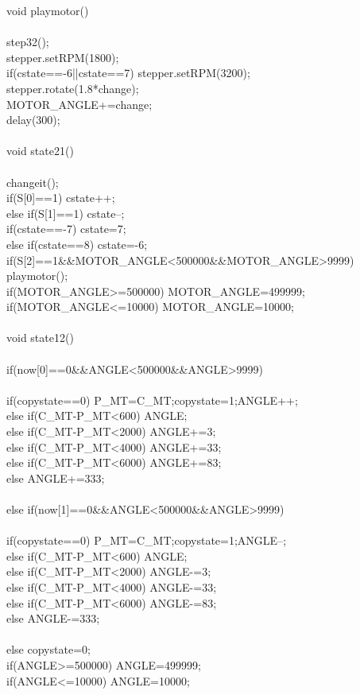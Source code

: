 void playmotor()\\
{\\
	step32();\\
	stepper.setRPM(1800);\\
	if(cstate==-6||cstate==7) stepper.setRPM(3200);\\
	stepper.rotate(1.8*change);\\
	MOTOR\_ANGLE+=change;\\
	delay(300);\\
}\\
void state21()\\
{\\
	changeit();\\
	if(S[0]==1) cstate++;\\
	else if(S[1]==1) cstate--;\\
	if(cstate==-7) cstate=7;\\
	else if(cstate==8) cstate=-6;\\
	if(S[2]==1\&\&MOTOR\_ANGLE<500000\&\&MOTOR\_ANGLE>9999) playmotor();\\
	if(MOTOR\_ANGLE>=500000) MOTOR\_ANGLE=499999;\\
	if(MOTOR\_ANGLE<=10000) MOTOR\_ANGLE=10000;\\
}\\
void state12()\\
{\\
	if(now[0]==0\&\&ANGLE<500000\&\&ANGLE>9999)\\
	{\\
		if(copystate==0) {P\_MT=C\_MT;copystate=1;ANGLE++;}\\
		else if(C\_MT-P\_MT<600) ANGLE;\\
		else if(C\_MT-P\_MT<2000) ANGLE+=3;\\
		else if(C\_MT-P\_MT<4000) ANGLE+=33;\\
		else if(C\_MT-P\_MT<6000) ANGLE+=83;\\
		else ANGLE+=333;\\
	}\\
	else if(now[1]==0\&\&ANGLE<500000\&\&ANGLE>9999)\\
	{\\
		if(copystate==0) {P\_MT=C\_MT;copystate=1;ANGLE--;}\\
		else if(C\_MT-P\_MT<600) ANGLE;\\
		else if(C\_MT-P\_MT<2000) ANGLE-=3;\\
		else if(C\_MT-P\_MT<4000) ANGLE-=33;\\
		else if(C\_MT-P\_MT<6000) ANGLE-=83;\\
		else ANGLE-=333;\\
	}\\
	else copystate=0;\\
	if(ANGLE>=500000) ANGLE=499999;\\
	if(ANGLE<=10000) ANGLE=10000;\\
}\\
